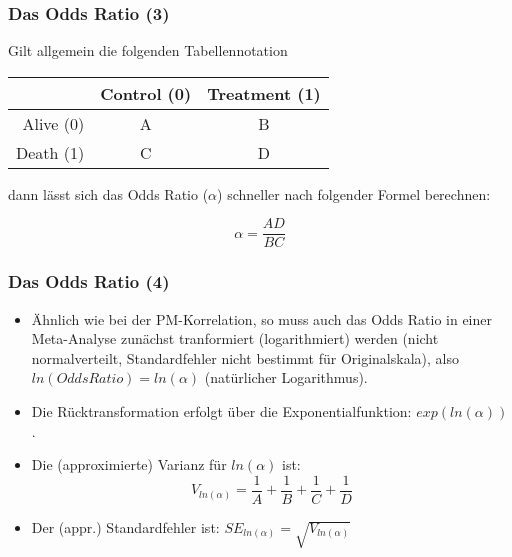 \begin{frame}\frametitle{Das Odds Ratio (3)}

Gilt allgemein die folgenden Tabellennotation  

\begin{center}
  \begin{tabular}{|r|c|c|}
    \hline
    & Control (0) & Treatment (1) \\
    \hline
    Alive (0) & A  & B   \\
    Death (1) & C  & D   \\
    \hline
  \end{tabular}
\end{center}

dann lässt sich das Odds Ratio ($\alpha$) schneller nach folgender Formel berechnen:

\begin{equation}
  \alpha = \frac{AD}{BC}
\end{equation}
\end{frame}
    

\begin{frame}\frametitle{Das Odds Ratio (4)}

  \begin{itemize}
  \item Ähnlich wie bei der PM-Korrelation, so muss auch das Odds Ratio in einer
    Meta-Analyse zunächst tranformiert (logarithmiert) werden (nicht normalverteilt,
    Standardfehler nicht bestimmt für Originalskala), also $ln(Odds Ratio) = ln(\alpha)$ (natürlicher Logarithmus).
  \item Die Rücktransformation erfolgt über die Exponentialfunktion: $exp(ln(\alpha))$.
  \item Die (approximierte) Varianz für $ln(\alpha)$ ist: 
    \begin{equation}
      V_{ln(\alpha)}= \frac{1}{A} + \frac{1}{B} + \frac{1}{C} + \frac{1}{D}
    \end{equation}
  \item Der (appr.) Standardfehler ist: $SE_{ln(\alpha)} = \sqrt{V_{ln(\alpha)}}$
  \end{itemize}
\end{frame}



